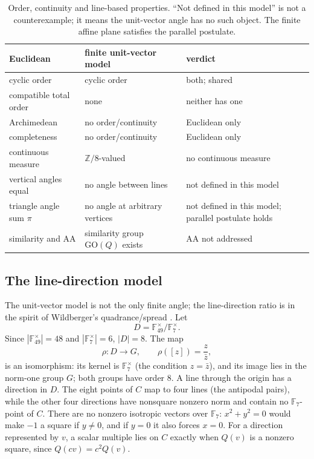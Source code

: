 \documentclass[11pt]{article}
\theoremstyle{definition}
\theoremstyle{remark}
\newcommand{\F}{\mathbb{F}}
\newcommand{\Z}{\mathbb{Z}}
\begin{document}
\begin{table}[htbp]
\centering
\small
\begin{tabularx}{\textwidth}{@{}>{\raggedright\arraybackslash}X>{\raggedright\arraybackslash}X>{\raggedright\arraybackslash}p{}@{}}
\toprule
Euclidean & finite unit-vector model & verdict\\
\midrule
cyclic order & cyclic order & both; shared\\
compatible total order & none & neither has one\\
Archimedean & no order/continuity & Euclidean only\\
completeness & no order/continuity & Euclidean only\\
continuous measure & $\Z/8$-valued & no continuous measure\\
vertical angles equal & no angle between lines & not defined in this model\\
triangle angle sum $\pi$ & no angle at arbitrary vertices & not defined in this model; parallel postulate holds\\
similarity and AA & similarity group $\mathrm{GO}(Q)$ exists & AA not addressed\\
\bottomrule
\end{tabularx}
\caption{Order, continuity and line-based properties.  ``Not defined in this
model'' is not a counterexample; it means the unit-vector angle has no such
object.  The finite affine plane satisfies the parallel postulate.}
\label{tab:euclid-geometry}
\end{table}

\subsection{The line-direction model}

The unit-vector model is not the only finite angle; the line-direction ratio is
in the spirit of Wildberger's quadrance/spread \cite{Wildberger}.  Let
\[
  D=\F_{49}^\times/\F_7^\times .
\]
Since $|\F_{49}^\times|=48$ and $|\F_7^\times|=6$, $|D|=8$.  The map
\[
  \rho:D\longrightarrow G,\qquad \rho([z])=\frac z{\bar z},
\]
is an isomorphism: its kernel is $\F_7^\times$ (the condition $z=\bar z$), and
its image lies in the norm-one group $G$; both groups have order $8$.  A line
through the origin has a direction in $D$.  The eight points of $C$ map to four
lines (the antipodal pairs), while the other four directions have nonsquare
nonzero norm and contain no $\F_7$-point of $C$.  There are no nonzero
isotropic vectors over $\F_7$: $x^2+y^2=0$ would make $-1$ a square if
$y\ne0$, and if $y=0$ it also forces $x=0$.  For a direction represented by
$v$, a scalar multiple lies on $C$ exactly when $Q(v)$ is a nonzero square,
since $Q(cv)=c^2Q(v)$.
\end{document}

